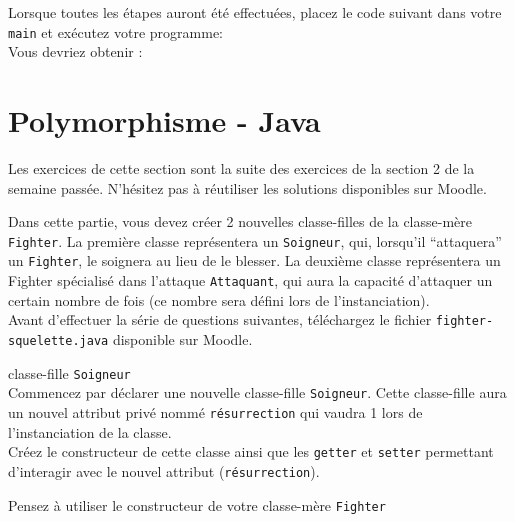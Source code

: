 \newpage
Lorsque toutes les étapes auront été effectuées, placez le code suivant dans votre \lstinline{main} et exécutez votre programme:\\




Vous devriez obtenir : \\




\newpage
\section{Polymorphisme - Java}

Les exercices de cette section sont la suite des exercices de la section 2 de la semaine passée.
N'hésitez pas à réutiliser les solutions disponibles sur Moodle.


Dans cette partie, vous devez créer 2 nouvelles classe-filles de la classe-mère \lstinline{Fighter}. La première classe représentera un \lstinline{Soigneur}, qui, lorsqu'il ``attaquera'' un \lstinline{Fighter}, le soignera au lieu de le blesser. La deuxième classe représentera un Fighter spécialisé dans l'attaque \lstinline{Attaquant}, qui aura la capacité d'attaquer un certain nombre de fois (ce nombre sera défini lors de l'instanciation).\\

Avant d'effectuer la série de questions suivantes, téléchargez le fichier \lstinline{fighter-squelette.java} disponible sur Moodle.\\

% 

\begin{Exercice}[5 minutes] classe-fille \lstinline{Soigneur} \\
Commencez par déclarer une nouvelle classe-fille \lstinline{Soigneur}. Cette classe-fille aura un nouvel attribut privé nommé \lstinline{résurrection} qui vaudra 1 lors de l'instanciation de la classe. \\

Créez le constructeur de cette classe ainsi que les \lstinline{getter} et \lstinline{setter} permettant d'interagir avec le nouvel attribut (\lstinline{résurrection}). \\

\begin{conseil}
Pensez à utiliser le constructeur de votre classe-mère \lstinline{Fighter}
\end{conseil}

\begin{solution}
	
\end{solution}

\end{Exercice}

